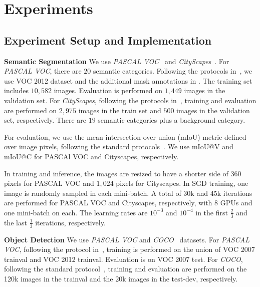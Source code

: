 \documentclass[10pt,twocolumn,letterpaper]{article}
\begin{document}
\section{Experiments}

\subsection{Experiment Setup and Implementation}
\label{sec.experiment_setup}

\textbf{Semantic Segmentation}
We use \emph{PASCAL VOC}~\cite{everingham2010pascal} and \emph{CityScapes}~\cite{cordts2016cityscapes}. For \emph{PASCAL VOC}, there are $20$ semantic categories. Following the protocols in~\cite{hariharan2014simultaneous,long2015fully,chen2015semantic}, we use VOC 2012 dataset and the additional mask annotations in \cite{hariharan2011semantic}. The training set includes $10,582$ images. Evaluation is performed on $1,449$ images in the validation set. For \emph{CityScapes}, following the protocols in~\cite{chen2016deeplab}, training and evaluation are performed on $2,975$ images in the train set and $500$ images in the validation set, respectively. There are $19$ semantic categories plus a background category.

For evaluation, we use the mean intersection-over-union (mIoU) metric defined over image pixels, following the standard protocols~\cite{everingham2010pascal,cordts2016cityscapes}. We use mIoU@V and mIoU@C for PASCAl VOC and Cityscapes, respectively.

In training and inference, the images are resized to have a shorter side of $360$ pixels for PASCAL VOC and $1,024$ pixels for Cityscapes. In SGD training, one image is randomly sampled in each mini-batch. A total of 30k and 45k iterations are performed for PASCAL VOC and Cityscapes, respectively, with 8 GPUs and one mini-batch on each. The learning rates are $10^{-3}$ and $10^{-4}$ in the first $\frac{2}{3}$ and the last $\frac{1}{3}$ iterations, respectively.

\textbf{Object Detection}
We use \emph{PASCAL VOC} and \emph{COCO}~\cite{lin2014coco} datasets. For \emph{PASCAL VOC}, following the protocol in~\cite{girshick2015fast}, training is performed on the union of VOC 2007 trainval and VOC 2012 trainval. Evaluation is on VOC 2007 test. For \emph{COCO}, following the standard protocol~\cite{lin2014coco}, training and evaluation are performed on the 120k images in the trainval and the 20k images in the test-dev, respectively.
\end{document}
